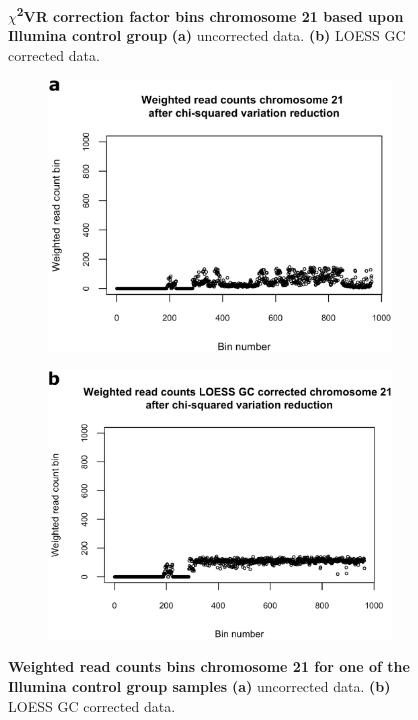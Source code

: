 \begin{figure}[h]
\begin{subfigure}{.5\textwidth}
		\label{fig:NIPT_Supp1_Fig1_4b}
	\end{subfigure} 
	\caption[Example $\chi$\textsuperscript{2}VR correction factor]{\textbf{$\chi$\textsuperscript{2}VR correction factor bins chromosome 21 based upon Illumina control group} \textbf{(a)} uncorrected data. \textbf{(b)} LOESS GC corrected data.}
	\label{fig:NIPT_Supp1_Fig1_4}
\end{figure}

\begin{figure}[h]
	\begin{subfigure}{.5\textwidth}
		\centering
		\includegraphics[width=1\linewidth]{img/NIPT_Supp1_Fig1_5a}
		\label{fig:NIPT_Supp1_Fig1_5a}
	\end{subfigure}%
	\begin{subfigure}{.5\textwidth}
		\centering
		\includegraphics[width=1\linewidth]{img/NIPT_Supp1_Fig1_5b}
		\label{fig:NIPT_Supp1_Fig1_5b}
	\end{subfigure} 
	\caption[Example Weighted read counts after $\chi$\textsuperscript{2}VR]{\textbf{Weighted read counts bins chromosome 21 for one of the Illumina control group samples} \textbf{(a)} uncorrected data. \textbf{(b)} LOESS GC corrected data.}
	\label{fig:NIPT_Supp1_Fig1_5}
\end{figure}

